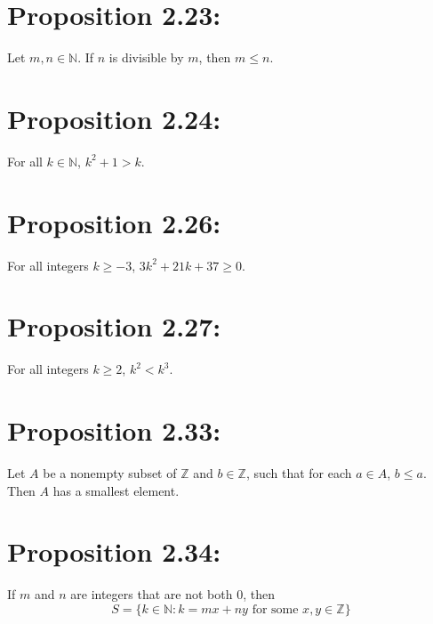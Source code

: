 \section*{Proposition 2.23:}
Let $m,n \in \mathbb{N}$. If $n$ is divisible by $m$, then $m \leq n$.

\section*{Proposition 2.24:}
For all $k \in \mathbb{N}$, $k^2 + 1 > k$.

\section*{Proposition 2.26:}
For all integers $k \geq -3$, $3k^2 + 21k + 37 \geq 0$.

\section*{Proposition 2.27:}
For all integers $k \geq 2$, $k^2 < k^3$.

\section*{Proposition 2.33:}
Let $A$ be a nonempty subset of $\mathbb{Z}$ and $b \in \mathbb{Z}$, such that for each $a \in A$, $b \leq a$. Then $A$ has a smallest element.

\section*{Proposition 2.34:}
If $m$ and $n$ are integers that are not both $0$, then
\[ S = \{ k \in \mathbb{N} : k = mx + ny \text{ for some } x,y \in \mathbb{Z} \} \]
